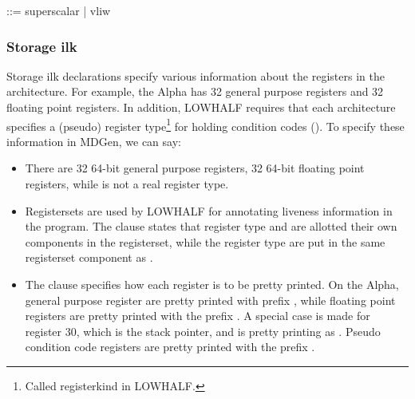 \begin{SML}
    ::= superscalar | vliw
\end{SML}

\subsubsection{Storage ilk}

Storage ilk declarations specify various information about the
registers in the architecture.  For example, the Alpha has 32 general
purpose registers and 32 floating point registers.  In addition, LOWHALF
requires that each architecture specifies a (pseudo) register 
type\footnote{Called registerkind in LOWHALF.} for 
holding condition codes (). 
To specify these information in MDGen, we can say:


\begin{itemize}
  \item There are 32 64-bit general purpose registers,
32 64-bit floating point registers, while  is not a 
real register type. 
  \item Registersets
are used by LOWHALF for annotating liveness information in the program.
  The clause  states that register type  
and  are allotted their own components in the registerset,    
while the register type  are put
in the same registerset component as .
  \item The clause  specifies
   how each register is to be pretty printed.  On the Alpha, general 
   purpose register are pretty printed with prefix \sml{$}, while
   floating point registers are pretty printed with the prefix . 
   A special case is made for register 30, which is the stack pointer, and 
   is pretty printing as .  Pseudo condition code registers
   are pretty printed with the prefix .   
\end{itemize}

